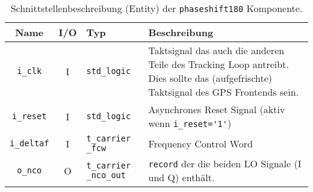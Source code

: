 \begin{table}[htbp]
    \ttabbox
    {
        \caption[Clock Synthesizer Schnittstelle]{Schnittstellenbeschreibung (Entity) der \lstinline$phaseshift180$ Komponente.}
        \label{TabCarrierNCO_Entity}
    }
    {
    \begin{tabular}{c c  p{2cm} p{6cm}}
        \toprule
        Name                    & I/O  & Typ                               & Beschreibung \\
        \midrule
        \lstinline$i_clk$       & I         & \lstinline$std_logic$             & Taktsignal das auch die anderen Teile des Tracking Loop antreibt. Dies sollte das (aufgefrischte) Taktsignal des GPS Frontends sein.\\
        \lstinline$i_reset$     & I         & \lstinline$std_logic$             & Asynchrones Reset Signal (aktiv wenn \lstinline$i_reset='1'$) \\
        \lstinline$i_deltaf$    & I         & \lstinline$t_carrier _fcw$             & Frequency Control Word \\
        \lstinline$o_nco$       & O         & \lstinline$t_carrier _nco_out$ & \lstinline$record$ der die beiden LO Signale (I und Q) enthält. \\
        \bottomrule
    \end{tabular}
}
\end{table}
